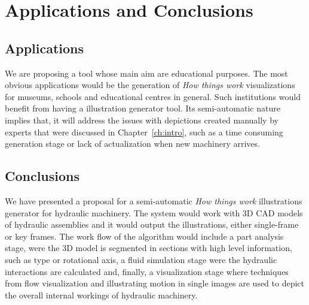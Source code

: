 \chapter{Applications and Conclusions}

\section{Applications}

We are proposing a tool whose main aim are educational purposes.
The most obvious applications would be the generation of \textit{How things work} visualizations for museums, schools and educational centres in general.
Such institutions would benefit from having a illustration generator tool.
Its semi-automatic nature implies that, it will address the issues with depictions created manually by experts that were discussed in Chapter~\ref{ch:intro}, such as a time consuming generation stage or lack of actualization when new machinery arrives.

\section{Conclusions}

We have presented a proposal for a semi-automatic \textit{How things work} illustrations generator for hydraulic machinery.
The system would work with 3D CAD models of hydraulic assemblies and it would output the illustrations, either single-frame or key frames.
The work flow of the algorithm would include a part analysis stage, were the 3D model is segmented in sections with high level information, such as type or rotational axis, a fluid simulation stage were the hydraulic interactions are calculated and, finally, a visualization stage where techniques from flow visualization and illustrating motion in single images are used to depict the overall internal workings of hydraulic machinery.